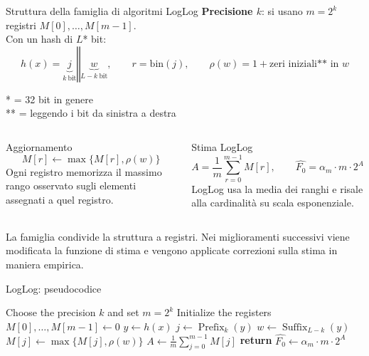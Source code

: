 \documentclass[aspectratio=169,11pt]{beamer}
\newcommand{\Fzero}{F_0}
\begin{document}

\begin{frame}{Struttura della famiglia di algoritmi LogLog}
  \small
  \textbf{Precisione \(k\)}: si usano \(m=2^k\) registri \(M[0],\dots,M[m-1]\). \\
  Con un hash di \(L\)* bit:
  \[
    h(x)=\underbrace{j}_{k\ \text{bit}} \mathbin{\Vert} \underbrace{w}_{L-k\ \text{bit}},
    \qquad
    r=\mathrm{bin}(j),
    \qquad
    \rho(w)=1+\text{zeri iniziali** in }w
  \]

  * = 32 bit in genere \\
  ** = leggendo i bit da sinistra a destra

  \begin{columns}[T,totalwidth=\textwidth]
      \begin{block}{Aggiornamento}
        \[
          M[r]\leftarrow \max\{M[r],\rho(w)\}
        \]
        \small
        Ogni registro memorizza il massimo rango osservato sugli elementi assegnati a quel registro.
      \end{block}
      \begin{block}{Stima LogLog}
        \[
          A=\frac{1}{m}\sum_{r=0}^{m-1}M[r],
          \qquad
          \widehat{\Fzero}=\alpha_m \cdot m \cdot 2^A
        \]
        \small
        LogLog usa la media dei ranghi e risale alla cardinalit\`a su scala esponenziale.
      \end{block}
  \end{columns}

  \vspace{0.20cm}

  \small
  La famiglia condivide la struttura a registri. Nei miglioramenti successivi viene modificata la funzione di stima e vengono applicate
  correzioni sulla stima in maniera empirica.
\end{frame}

\begin{frame}{LogLog: pseudocodice}
  
    \begin{algorithmic}
      \STATE Choose the precision \(k\) and set \(m=2^k\)
      \STATE Initialize the registers \(M[0],\dots,M[m-1]\leftarrow 0\)
        \STATE \(y \leftarrow h(x)\)
        \STATE \(j \leftarrow \operatorname{Prefix}_{k}(y)\)
        \STATE \(w \leftarrow \operatorname{Suffix}_{L-k}(y)\)
        \STATE \(M[j] \leftarrow \max\{M[j],\rho(w)\}\)
      \ENDFOR
      \STATE \(A \leftarrow \frac{1}{m}\sum_{j=0}^{m-1} M[j]\)
      \STATE \textbf{return} \(\widehat{\Fzero} \leftarrow \alpha_m \cdot m \cdot 2^A\)
    \end{algorithmic}
  
\end{frame}
\end{document}
